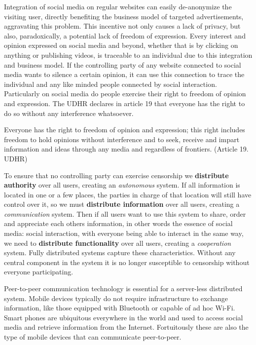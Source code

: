 Integration of social media on regular websites can easily de-anonymize the visiting user, directly benefiting the business model of targeted advertisements, aggravating this problem.
This incentive not only causes a lack of privacy, but also, paradoxically, a potential lack of freedom of expression.
Every interest and opinion expressed on social media and beyond, whether that is by clicking on anything or publishing videos, is traceable to an individual due to this integration and business model.
If the controlling party of any website connected to social media wants to silence a certain opinion, it can use this connection to trace the individual and any like minded people connected by social interaction.
Particularly on social media do people exercise their right to freedom of opinion and expression.
The UDHR declares in article 19 that everyone has the right to do so without any interference whatsoever.

\begin{displayquote}
	Everyone has the right to freedom of opinion and expression; this right includes freedom to hold opinions without interference and to seek, receive and impart information and ideas through any media and regardless of frontiers.
	(Article 19. UDHR)
\end{displayquote}

To ensure that no controlling party can exercise censorship we \textbf{distribute authority} over all users, creating an \emph{autonomous} system.
If all information is located in one or a few places, the parties in charge of that location will still have control over it, so we must \textbf{distribute information} over all users, creating a \emph{communication} system.
Then if all users want to use this system to share, order and appreciate each others information, in other words the essence of social media: social interaction, with everyone being able to interact in the same way, we need to  \textbf{distribute functionality} over all users, creating a \emph{cooperation} system.
Fully distributed systems capture these characteristics. %
Without any central component in the system it is no longer susceptible to censorship without everyone participating.

Peer-to-peer communication technology is essential for a server-less distributed system.
Mobile devices typically do not require infrastructure to exchange information, like those equipped with Bluetooth or capable of ad hoc Wi-Fi.
Smart phones are ubiquitous everywhere in the world and used to access social media and retrieve information from the Internet.
Fortuitously these are also the type of mobile devices that can communicate peer-to-peer.

